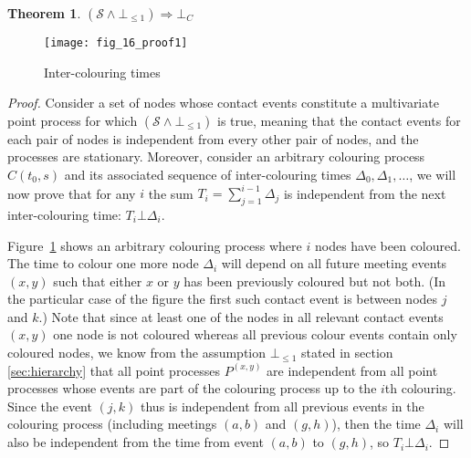 \documentclass{article}
\newtheorem{theorem}{Theorem}
\begin{document}
\begin{theorem}
  $(\mathcal{S} \land \bot_{\le 1}) \Rightarrow \bot_C$
\end{theorem}
\begin{figure}[ht]
  \centering
  \texttt{[image: fig\_16\_proof1]}
  \caption{Inter-colouring times}
  \label{fig:inter-colouring}
\end{figure}
\begin{proof}
  Consider a set of nodes whose contact events constitute a
  multivariate point process for which $(\mathcal{S} \land \bot_{\le
    1})$ is true, meaning that the contact events for each pair of
  nodes is independent from every other pair of nodes, and the
  processes are stationary. Moreover, consider an arbitrary colouring
  process $C(t_0,s)$ and its associated sequence of inter-colouring
  times $\Delta_0,\Delta_1,\ldots$, we will now prove that for any $i$
  the sum $T_i = \sum_{j=1}^{i-1}\Delta_j$ is independent from the
  next inter-colouring time: $T_i \bot \Delta_i$.

  Figure~\ref{fig:inter-colouring} shows an arbitrary colouring
  process where $i$ nodes have been coloured. The time to colour one
  more node $\Delta_i$ will depend on all future meeting events
  $(x,y)$ such that either $x$ or $y$ has been previously coloured but
  not both. (In the particular case of the figure the first such
  contact event is between nodes $j$ and $k$.) Note that since at
  least one of the nodes in all relevant contact events $(x,y)$ one
  node is not coloured whereas all previous colour events contain only
  coloured nodes, we know from the assumption $\bot_{\le 1}$ stated in
  section \ref{sec:hierarchy} that all point processes $P^{(x,y)}$ are
  independent from all point processes whose events are part of the
  colouring process up to the $i$th colouring. Since the event $(j,k)$
  thus is independent from all previous events in the colouring
  process (including meetings $(a,b)$ and $(g,h)$), then the time
  $\Delta_i$ will also be independent from the time from event $(a,b)$
  to $(g,h)$, so $T_i\bot \Delta_i$.

\end{proof}
\end{document}
